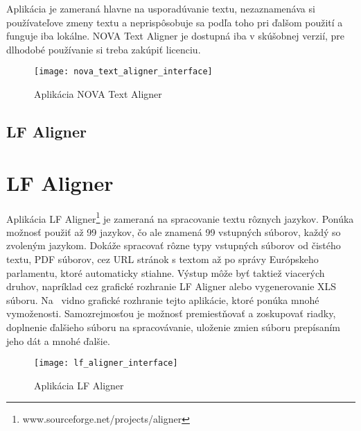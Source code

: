 Aplikácia je zameraná hlavne na usporadúvanie textu, nezaznamenáva si používateľove zmeny textu a neprispôsobuje sa podľa toho pri ďalšom použití a funguje iba lokálne. NOVA Text Aligner je dostupná iba v skúšobnej verzií, pre dlhodobé používanie si treba zakúpiť licenciu.

\begin{figure}[H]
	\begin{center}\texttt{[image: nova\_text\_aligner\_interface]}\end{center}
	\caption[Aplikácia NOVA Text Aligner]{Aplikácia NOVA Text Aligner\footnotemark}\label{fig:nova_text_aligner_interface}
\end{figure}

%
%
{
	\subsection{LF Aligner}
}
{
	\section{LF Aligner}
}
Aplikácia LF Aligner\footnote{www.sourceforge.net/projects/aligner} je zameraná na spracovanie textu rôznych jazykov. Ponúka možnosť použiť až 99 jazykov, čo ale znamená 99 vstupných súborov, každý so zvoleným jazykom. Dokáže spracovať rôzne typy vstupných súborov od čistého textu, PDF súborov, cez URL stránok s textom až po správy Európskeho parlamentu, ktoré automaticky stiahne. Výstup môže byť taktiež viacerých druhov, napríklad cez grafické rozhranie LF Aligner alebo vygenerovanie XLS súboru. Na~ vidno grafické rozhranie tejto aplikácie, ktoré ponúka mnohé vymoženosti. Samozrejmosťou je možnosť premiestňovať a zoskupovať riadky, doplnenie ďalšieho súboru na spracovávanie, uloženie zmien súboru prepísaním jeho dát a mnohé ďalšie.

\begin{figure}[H]
	\begin{center}\texttt{[image: lf\_aligner\_interface]}\end{center}
	\caption[Aplikácia LF Aligner]{Aplikácia LF Aligner}\label{fig:lf_aligner_interface}
\end{figure}

